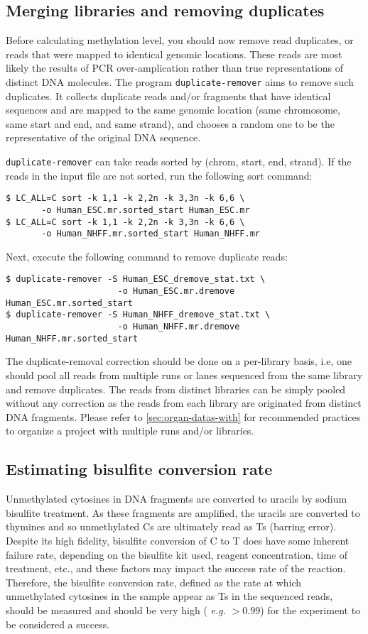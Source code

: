 \documentclass[10pt]{article}
\newcommand{\prog}[1]{\texttt{#1}}
\begin{document}
\subsection{Merging libraries and removing duplicates}

Before calculating methylation level, you should now remove read
duplicates, or reads that were mapped to identical genomic
locations. These reads are most likely the results of PCR
over-amplication rather than true representations of distinct DNA
molecules. The program \prog{duplicate-remover} aims to remove such
duplicates. It collects duplicate reads and/or fragments that have
identical sequences and are mapped to the same genomic location (same
chromosome, same start and end, and same strand), and chooses a random
one to be the representative of the original DNA sequence.

\prog{duplicate-remover} can take reads sorted by (chrom, start, end,
strand). If the reads in the input file are not sorted, run the
following sort command:
\begin{verbatim}
$ LC_ALL=C sort -k 1,1 -k 2,2n -k 3,3n -k 6,6 \
       -o Human_ESC.mr.sorted_start Human_ESC.mr
$ LC_ALL=C sort -k 1,1 -k 2,2n -k 3,3n -k 6,6 \
       -o Human_NHFF.mr.sorted_start Human_NHFF.mr
\end{verbatim}
Next, execute the following command to remove duplicate reads:
\begin{verbatim}
$ duplicate-remover -S Human_ESC_dremove_stat.txt \
                      -o Human_ESC.mr.dremove Human_ESC.mr.sorted_start
$ duplicate-remover -S Human_NHFF_dremove_stat.txt \
                      -o Human_NHFF.mr.dremove Human_NHFF.mr.sorted_start
\end{verbatim}
The duplicate-removal correction should be done on a per-library
basis, i.e, one should pool all reads from multiple runs or lanes
sequenced from the same library and remove duplicates. The reads from
distinct libraries can be simply pooled without any correction as the
reads from each library are originated from distinct DNA
fragments. Please refer to \ref{sec:organ-datas-with} for recommended
practices to organize a project with multiple runs and/or libraries.


\subsection{Estimating bisulfite conversion rate}
\label{sec:estim-busilf-conv}

Unmethylated cytosines in DNA fragments are converted to uracils by
sodium bisulfite treatment. As these fragments are amplified, the
uracils are converted to thymines and so unmethylated Cs are
ultimately read as Ts (barring error). Despite its high fidelity,
bisulfite conversion of C to T does have some inherent failure rate,
depending on the bisulfite kit used, reagent concentration, time of
treatment, etc., and these factors may impact the success rate of the
reaction. Therefore, the bisulfite conversion rate, defined as the
rate at which unmethylated cytosines in the sample appear as Ts in the
sequenced reads, should be measured and should be very high ({\em
  e.g.} $>0.99$) for the experiment to be considered a success.
\end{document}
